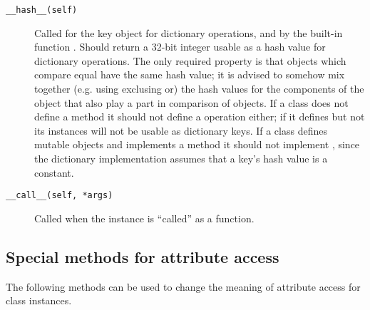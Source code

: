 \begin{description}
\item[{\tt __hash__(self)}]
Called for the key object for dictionary operations,
and by the built-in function
.  Should return a 32-bit integer usable as a hash value
for dictionary operations.  The only required property is that objects
which compare equal have the same hash value; it is advised to somehow
mix together (e.g. using exclusing or) the hash values for the
components of the object that also play a part in comparison of
objects.  If a class does not define a  method it should
not define a  operation either; if it defines
 but not  its instances will not be
usable as dictionary keys.  If a class defines mutable objects and
implements a  method it should not implement
, since the dictionary implementation assumes that a
key's hash value is a constant.

\item[{\tt __call__(self, *args)}]
Called when the instance is ``called'' as a function.

\end{description}


\subsection{Special methods for attribute access}

The following methods can be used to change the meaning of attribute
access for class instances.

